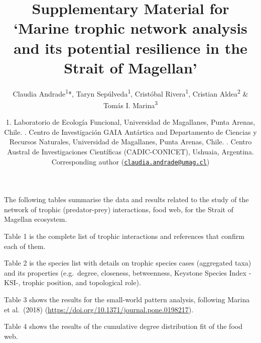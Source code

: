 \documentclass[
]{article}
\title{Supplementary Material for `Marine trophic network analysis and
its potential resilience in the Strait of Magellan'}
\author{Claudia Andrade\textsuperscript{1}*, Taryn
Sepúlveda\textsuperscript{1}, Cristóbal Rivera\textsuperscript{1},
Cristian Aldea\textsuperscript{2} \& Tomás I. Marina\textsuperscript{3}}
\date{1. Laboratorio de Ecología Funcional, Universidad de Magallanes,
Punta Arenas, Chile. \newline 2. Centro de Investigación GAIA Antártica
and Departamento de Ciencias y Recursos Naturales, Universidad de
Magallanes, Punta Arenas, Chile. \newline 3. Centro Austral de
Investigaciones Científicas (CADIC-CONICET), Ushuaia, Argentina.
\newline *Corresponding author
(\href{mailto:claudia.andrade@umag.cl}{\nolinkurl{claudia.andrade@umag.cl}})}
\begin{document}
\maketitle

The following tables summarise the data and results related to the study
of the network of trophic (predator-prey) interactions, food web, for
the Strait of Magellan ecosystem.

Table 1 is the complete list of trophic interactions and references that
confirm each of them.

Table 2 is the species list with details on trophic species cases
(aggregated taxa) and its properties (e.g.~degree, closeness,
betweenness, Keystone Species Index -KSI-, trophic position, and
topological role).

Table 3 shows the results for the small-world pattern analysis,
following Marina et al.~(2018)
(\url{https://doi.org/10.1371/journal.pone.0198217}).

Table 4 shows the results of the cumulative degree distribution fit of
the food web.
\end{document}
